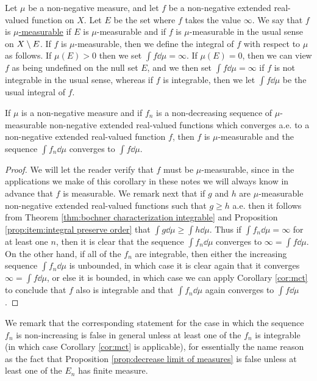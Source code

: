 \begin{definition}
\label{def:extended real meas integrable}
Let $\mu$ be a non-negative measure, and let $f$ be a non-negative extended real-valued function on $X$. Let $E$ be the set where $f$ takes the value $\infty$. We say that $f$ is \underline{$\mu$-measurable} if $E$ is $\mu$-measurable and if $f$ is $\mu$-measurable in the usual sense on $X\setminus E$. If $f$ is $\mu$-measurable, then we define the integral of $f$ with respect to $\mu$ as follows. If $\mu(E)>0$ then we set $\int f\dd\mu=\infty$. If $\mu(E)=0$, then we can view $f$ as being undefined on the null set $E$, and we then set $\int f\dd\mu=\infty$ if $f$ is not integrable in the usual sense, whereas if $f$ is integrable, then we let $\int f\dd\mu$ be the usual integral of $f$.
\end{definition}

\begin{corollary}
\label{cor:mct extended real}
If $\mu$ is a non-negative measure and if $f_n$ is a non-decreasing sequence of $\mu$-measurable non-negative extended real-valued functions which converges a.e. to a non-negative extended real-valued function $f$, then $f$ is $\mu$-measurable and the sequence $\int f_n\dd\mu$ converges to $\int f\dd\mu$.
\end{corollary}

\begin{proof}
We will let the reader verify that $f$ must be $\mu$-measurable, since in the applications we make of this corollary in these notes we will always know in advance that $f$ is measurable. We remark next that if $g$ and $h$ are $\mu$-measurable non-negative extended real-valued functions such that $g\geq h$ a.e. then it follows from Theorem \ref{thm:bochner characterization integrable} and Proposition \ref{prop:item:integral preserve order} that $\int g\dd\mu\geq\int h\dd\mu$. Thus if $\int f_n\dd\mu=\infty$ for at least one $n$, then it is clear that the sequence $\int f_n\dd\mu$ converges to $\infty=\int f\dd\mu$. On the other hand, if all of the $f_n$ are integrable, then either the increasing sequence $\int f_n\dd\mu$ is unbounded, in which case it is clear again that it converges $\infty=\int f\dd\mu$, or else it is bounded, in which case we can apply Corollary \ref{cor:mct} to conclude that $f$ also is integrable and that $\int f_n\dd\mu$ again converges to $\int f\dd\mu$.
\end{proof}

We remark that the corresponding statement for the case in which the sequence $f_n$ is non-increasing is false in general unless at least one of the $f_n$ is integrable (in which case Corollary \ref{cor:mct} is applicable), for essentially the name reason as the fact that Proposition \ref{prop:decrease limit of measures} is false unless at least one of the $E_n$ has finite measure.

